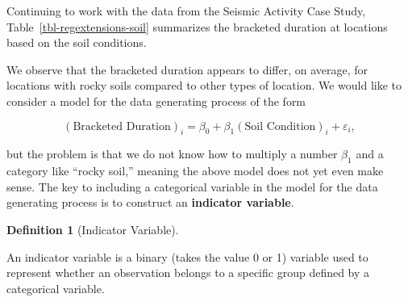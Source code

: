 \documentclass[
  letterpaper,
  DIV=11,
  numbers=noendperiod]{scrreprt}
\theoremstyle{definition}
\newtheorem{definition}{Definition}[chapter]
\theoremstyle{definition}
\theoremstyle{plain}
\theoremstyle{remark}
\begin{document}
Continuing to work with the data from the Seismic Activity Case Study,
Table~\ref{tbl-regextensions-soil} summarizes the bracketed duration at
locations based on the soil conditions.

\begin{table}

\caption{\label{tbl-regextensions-soil}Numerical summaries of the
bracketed duration for locations based on their soil conditions.}


\end{table}%

We observe that the bracketed duration appears to differ, on average,
for locations with rocky soils compared to other types of location. We
would like to consider a model for the data generating process of the
form

\[(\text{Bracketed Duration})_i = \beta_0 + \beta_1 (\text{Soil Condition})_i + \varepsilon_i,\]

but the problem is that we do not know how to multiply a number
\(\beta_1\) and a category like ``rocky soil,'' meaning the above model
does not yet even make sense. The key to including a categorical
variable in the model for the data generating process is to construct an
\textbf{indicator variable}.

\begin{definition}[Indicator
Variable]\protect\hypertarget{def-indicator-variable}{}\label{def-indicator-variable}

An indicator variable is a binary (takes the value 0 or 1) variable used
to represent whether an observation belongs to a specific group defined
by a categorical variable.

\end{definition}
\end{document}
